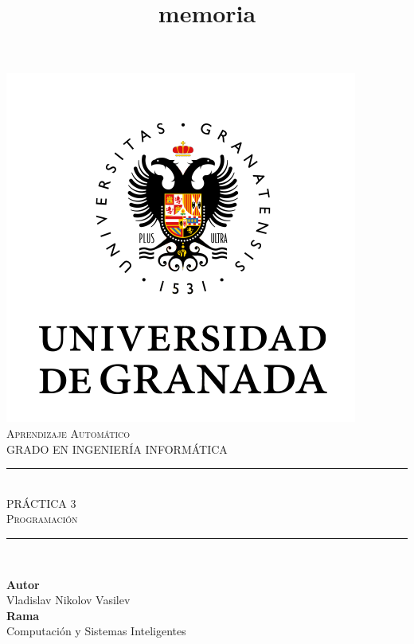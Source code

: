 \documentclass[11pt,a4paper]{article}
\title{memoria}
\newcommand{\asignatura}{Aprendizaje Automático}
\newcommand{\autor}{Vladislav Nikolov Vasilev}
\begin{document}

\begin{titlepage}

\begin{minipage}{\textwidth}

\centering

\includegraphics[scale=0.5]{img/ugr.png}\\

\textsc{\Large \asignatura{}\\[0.2cm]}
\textsc{GRADO EN INGENIERÍA INFORMÁTICA}\\[1cm]

\noindent\rule[-1ex]{\textwidth}{1pt}\\[1.5ex]
\textsc{{\Huge PRÁCTICA 3\\[0.5ex]}}
\textsc{{\Large Programación\\}}
\noindent\rule[-1ex]{\textwidth}{2pt}\\[3.5ex]

\end{minipage}

\vspace{0.5cm}

\begin{minipage}{\textwidth}

\centering

\textbf{Autor}\\ {\autor{}}\\[2.5ex]
\textbf{Rama}\\ {Computación y Sistemas Inteligentes}\\[2.5ex]
\vspace{0.3cm}


\end{minipage}
\end{titlepage}
\end{document}
